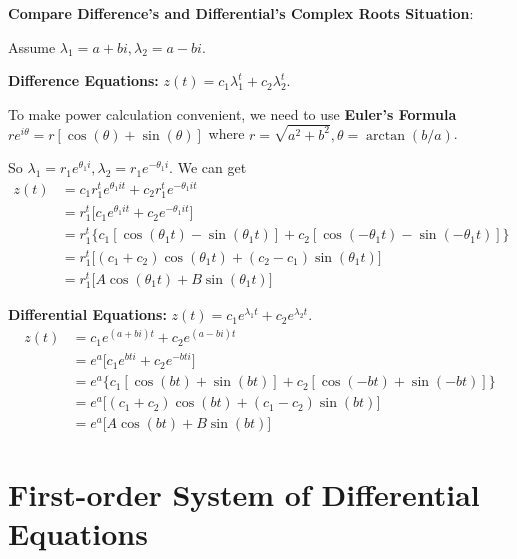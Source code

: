 \begin{remark*} \textbf{Compare Difference's and Differential's Complex Roots Situation}:

    Assume $\lambda_1 = a+bi, \lambda_2 = a-bi$.

    \textbf{Difference Equations:} $z(t) = c_1\lambda_1 ^{t} + c_2\lambda_2 ^{t}$.

    To make power calculation convenient, we need to use \textbf{Euler's Formula} $re ^{i\theta} = r[\cos(\theta) + \sin(\theta)]$ where $r = \sqrt{a ^{2} + b ^{2}}, \theta = \arctan (b/a)$.

    So $\lambda_1 = r_1 e ^{\theta_1 i}, \lambda_2 = r_1 e ^{-\theta_1 i}$. We can get \begin{align*}
        z(t) & = c_1 r_1 ^{t} e ^{\theta_1 it} + c_2 r_1 ^{t} e ^{-\theta_1 it}                                  \\
             & = r_1 ^{t}\Big[c_1e ^{\theta_1 it}  + c_2 e ^{-\theta_1 it} \Big]                                 \\
             & = r_1^{t}\{c_1 [\cos(\theta_1t) - \sin(\theta_1t)]  + c_2 [\cos(-\theta_1t) - \sin(-\theta_1t)]\} \\
             & = r_1^{t}\Big[(c_1+c_2)\cos(\theta_1t) + (c_2 - c_1)\sin(\theta_1t)\Big]                          \\
             & = r_1^{t}\Big[A\cos(\theta_1t) + B\sin(\theta_1t)\Big]
    \end{align*}

    \textbf{Differential Equations:} $z(t) = c_1 e ^{\lambda_1 t} + c_2e ^{\lambda_2 t}$. \begin{align*}
        z(t) & = c_1 e ^{(a+bi) t} + c_2e ^{(a-bi) t}                              \\
             & = e ^{a} \Big[c_1 e ^{bti} + c_2 e ^{-bti}\Big]                     \\
             & = e ^{a} \{c_1 [\cos(bt) + \sin(bt)]+ c_2 [\cos(-bt) + \sin(-bt)]\} \\
             & = e ^{a} \Big[(c_1 + c_2)\cos(bt) + (c_1-c_2)\sin(bt)\Big]          \\
             & = e ^{a} \Big[A \cos(bt) + B \sin(bt)\Big]
    \end{align*}
\end{remark*}

\section{First-order System of Differential Equations}

